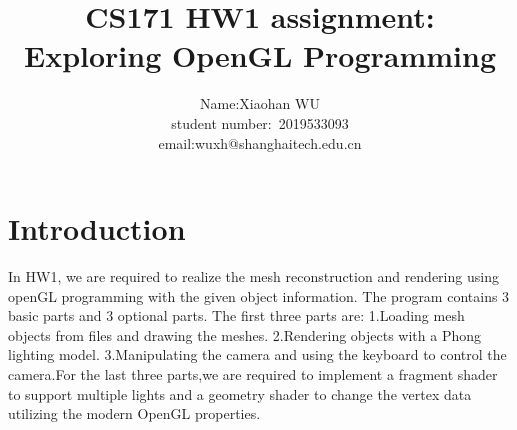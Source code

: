 \documentclass[acmtog]{acmart}
\title{CS171 HW1 assignment:\\ {Exploring OpenGL Programming}}
\author{Name:\quad Xiaohan WU  \\ student number:\ 2019533093
\\email:\quad wuxh@shanghaitech.edu.cn}
\begin{document}
\maketitle

\vspace*{2 ex}

\section{Introduction}
\qquad In HW1, we are required to realize the mesh reconstruction and rendering using openGL programming with the given object information. The program contains 3 basic parts and 3 optional parts. The first three parts are: 1.Loading mesh objects from files and drawing the meshes.
2.Rendering objects with a Phong lighting model.
3.Manipulating the camera and using the keyboard to control the camera.For the last three parts,we are required to implement a fragment shader to support multiple lights and a geometry shader to change the vertex data utilizing the modern OpenGL properties.
\end{document}
